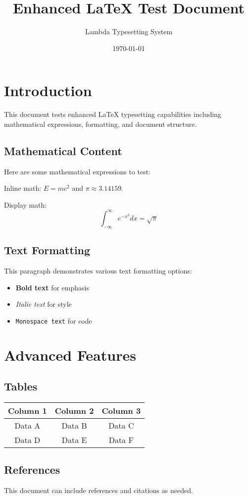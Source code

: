 \documentclass[12pt,a4paper]{article}
\title{Enhanced LaTeX Test Document}
\author{Lambda Typesetting System}
\date{\today}
\begin{document}
\maketitle

\section{Introduction}

This document tests enhanced LaTeX typesetting capabilities including mathematical expressions, formatting, and document structure.

\subsection{Mathematical Content}

Here are some mathematical expressions to test:

Inline math: $E = mc^2$ and $\pi \approx 3.14159$.

Display math:
\begin{equation}
\int_{-\infty}^{\infty} e^{-x^2} dx = \sqrt{\pi}
\end{equation}

\subsection{Text Formatting}

This paragraph demonstrates various text formatting options:
\begin{itemize}
    \item \textbf{Bold text} for emphasis
    \item \textit{Italic text} for style
    \item \texttt{Monospace text} for code
\end{itemize}

\section{Advanced Features}

\subsection{Tables}

\begin{tabular}{|c|c|c|}
\hline
Column 1 & Column 2 & Column 3 \\
\hline
Data A & Data B & Data C \\
Data D & Data E & Data F \\
\hline
\end{tabular}

\subsection{References}

This document can include references and citations as needed.
\end{document}
